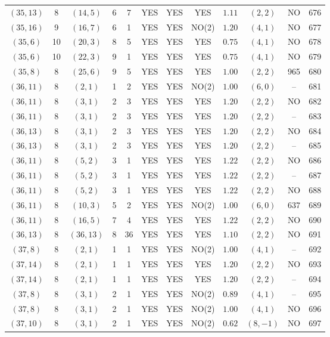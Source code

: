 \begin{longtable}{|c|c|c|c|c|c|c|c|c|c|c|c|}
$(35,13)$ & 8 & $(14,5)$ & 6 & 7 & YES & YES & YES & $1.11$ & $(2,2)$ & NO & 676\\
$(35,16)$ & 9 & $(16,7)$ & 6 & 1 & YES & YES & NO(2) & $1.20$ & $(4,1)$ & NO & 677\\
$(35,6)$ & 10 & $(20,3)$ & 8 & 5 & YES & YES & YES & $0.75$ & $(4,1)$ & NO & 678\\
$(35,6)$ & 10 & $(22,3)$ & 9 & 1 & YES & YES & YES & $0.75$ & $(4,1)$ & NO & 679\\
$(35,8)$ & 8 & $(25,6)$ & 9 & 5 & YES & YES & YES & $1.00$ & $(2,2)$ & 965 & 680\\
$(36,11)$ & 8 & $(2,1)$ & 1 & 2 & YES & YES & NO(2) & $1.00$ & $(6,0)$ & -- & 681\\
$(36,11)$ & 8 & $(3,1)$ & 2 & 3 & YES & YES & YES & $1.20$ & $(2,2)$ & NO & 682\\
$(36,11)$ & 8 & $(3,1)$ & 2 & 3 & YES & YES & YES & $1.20$ & $(2,2)$ & -- & 683\\
$(36,13)$ & 8 & $(3,1)$ & 2 & 3 & YES & YES & YES & $1.20$ & $(2,2)$ & NO & 684\\
$(36,13)$ & 8 & $(3,1)$ & 2 & 3 & YES & YES & YES & $1.20$ & $(2,2)$ & -- & 685\\
$(36,11)$ & 8 & $(5,2)$ & 3 & 1 & YES & YES & YES & $1.22$ & $(2,2)$ & NO & 686\\
$(36,11)$ & 8 & $(5,2)$ & 3 & 1 & YES & YES & YES & $1.22$ & $(2,2)$ & -- & 687\\
$(36,11)$ & 8 & $(5,2)$ & 3 & 1 & YES & YES & YES & $1.22$ & $(2,2)$ & NO & 688\\
$(36,11)$ & 8 & $(10,3)$ & 5 & 2 & YES & YES & NO(2) & $1.00$ & $(6,0)$ & 637 & 689\\
$(36,11)$ & 8 & $(16,5)$ & 7 & 4 & YES & YES & YES & $1.22$ & $(2,2)$ & NO & 690\\
$(36,13)$ & 8 & $(36,13)$ & 8 & 36 & YES & YES & YES & $1.10$ & $(2,2)$ & NO & 691\\
$(37,8)$ & 8 & $(2,1)$ & 1 & 1 & YES & YES & NO(2) & $1.00$ & $(4,1)$ & -- & 692\\
$(37,14)$ & 8 & $(2,1)$ & 1 & 1 & YES & YES & YES & $1.20$ & $(2,2)$ & NO & 693\\
$(37,14)$ & 8 & $(2,1)$ & 1 & 1 & YES & YES & YES & $1.20$ & $(2,2)$ & -- & 694\\
$(37,8)$ & 8 & $(3,1)$ & 2 & 1 & YES & YES & NO(2) & $0.89$ & $(4,1)$ & -- & 695\\
$(37,8)$ & 8 & $(3,1)$ & 2 & 1 & YES & YES & NO(2) & $1.00$ & $(4,1)$ & NO & 696\\
$(37,10)$ & 8 & $(3,1)$ & 2 & 1 & YES & YES & NO(2) & $0.62$ & $(8,-1)$ & NO & 697\\

\end{longtable}
